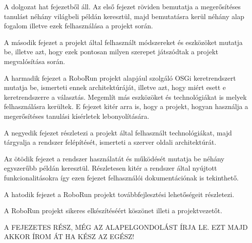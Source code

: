 	A dolgozat hat fejezetből áll. Az első fejezet röviden bemutatja a megerősítéses tanulást néhány világbeli példán keresztül, majd bemutatásra kerül néhány alap fogalom illetve ezek felhasználása a projekt során.

	A második fejezet a projekt által felhasznált módszereket és eszközöket mutatja be, illetve azt, hogy ezek pontosan milyen szerepet játszódtak a projekt megvalósítása során.	
	
	A harmadik fejezet a RoboRun projekt alapjául szolgáló OSGi keretrendszert mutatja be, ismerteti ennek architektúráját, illetve azt, hogy  miért esett e keretrendszerre a választás. Megemlít más eszközöket és technológiákat is melyek felhasználásra kerültek. E fejezet kitér arra is, hogy a projekt, hogyan használja a megerősítéses tanulási kísérletek lebonyolítására.
	
	A negyedik fejezet részletezi a projekt által felhasznált technológiákat, majd tárgyalja a rendszer felépítését, ismerteti a szerver oldali architektúrát. 
	
	Az ötödik fejezet a rendszer használatát és működését mutatja be néhány egyszerűbb példán keresztül. Részletesen kitér a rendszer által nyújtott funkcionalitásokra így ezen fejezet felhasználói dokumentációnak is tekinthető.
	
	A hatodik fejezet a RoboRun projekt továbbfejlesztési lehetőségeit részletezi.
	
	A RoboRun projekt sikeres elkészítéséért köszönet illeti a projektvezetőt.
	
	A FEJEZETES RÉSZ, MÉG AZ ALAPELGONDOLÁST ÍRJA LE. EZT MAJD AKKOR ÍROM ÁT HA KÉSZ AZ EGÉSZ!
	
